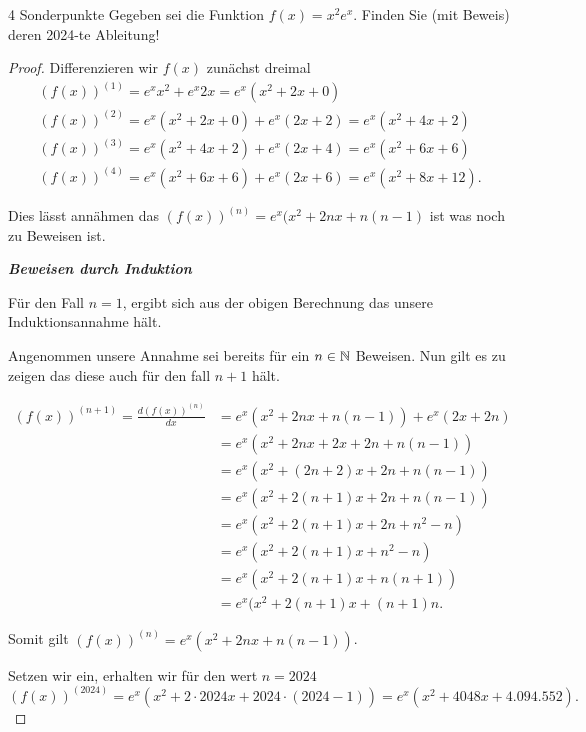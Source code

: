 \documentclass{problemset}
\begin{document}
\begin{problem}{4 Sonderpunkte}
Gegeben sei die Funktion $f(x) = x^2 e^x$. Finden Sie (mit Beweis) deren 2024-te Ableitung!

\begin{proof}
    Differenzieren wir $f(x)$ zunächst dreimal
    \begin{align*}
        (f(x))^{(1)} = e^xx^2 + e^x2x = e^x(x^2 + 2x + 0)                  \\
        (f(x))^{(2)} = e^x(x^2 + 2x + 0) + e^x(2x + 2) = e^x(x^2 + 4x + 2) \\
        (f(x))^{(3)} = e^x(x^2 + 4x + 2) + e^x(2x + 4) = e^x(x^2 + 6x + 6) \\
        (f(x))^{(4)} = e^x(x^2 + 6x + 6) + e^x(2x + 6) = e^x(x^2 + 8x + 12).
    \end{align*}

    Dies lässt annähmen das $(f(x))^{(n)} = e^x(x^2 + 2nx + n(n-1)$ ist was noch zu Beweisen ist.

    \textbf{\textit{Beweisen durch Induktion}}

    Für den Fall $n = 1$, ergibt sich aus der obigen Berechnung das unsere Induktionsannahme hält.

    Angenommen unsere Annahme sei bereits für ein $n \in \mathbb{N}$ Beweisen. Nun gilt es zu zeigen das diese auch für den fall $n + 1$ hält.

    \begin{align*}
        (f(x))^{(n + 1)} = \frac{d (f(x))^{(n)}}{dx} & = e^x(x^2 + 2nx + n(n-1)) + e^x(2x + 2n) \\
                                                     & = e^x(x^2 + 2nx + 2x + 2n + n(n-1))      \\
                                                     & = e^x(x^2 + (2n + 2)x + 2n + n(n-1))     \\
                                                     & = e^x(x^2 + 2(n + 1)x + 2n + n(n-1))     \\
                                                     & = e^x(x^2 + 2(n + 1)x + 2n + n^2 -n)     \\
                                                     & = e^x(x^2 + 2(n + 1)x + n^2 - n)         \\
                                                     & = e^x(x^2 + 2(n + 1)x + n(n + 1))        \\
                                                     & = e^x(x^2 + 2(n + 1)x + (n + 1)n.
    \end{align*}

    Somit gilt $(f(x))^{(n)} = e^x(x^2 + 2nx + n(n-1))$.

    Setzen wir ein, erhalten wir für den wert $n = 2024$
    \[
        (f(x))^{(2024)} = e^x(x^2 + 2 \cdot 2024x + 2024 \cdot (2024 - 1)) = e^x(x^2 + 4048x + 4.094.552).
    \]


\end{proof}
\end{problem}
\end{document}
